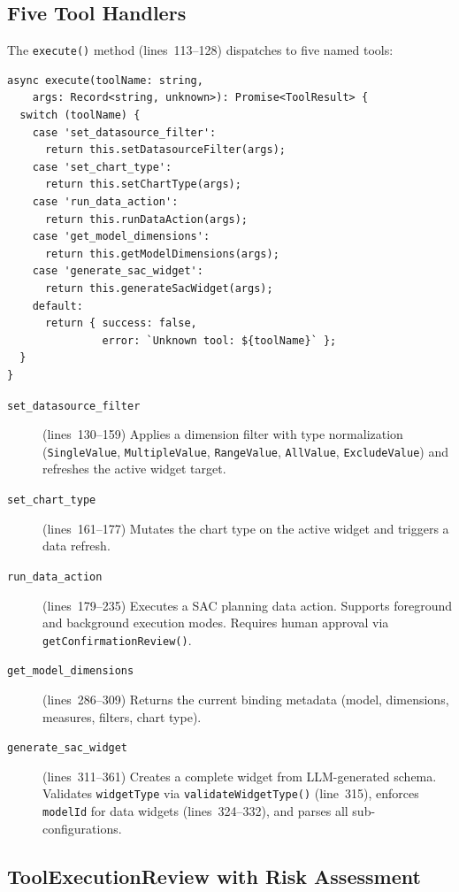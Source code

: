 \documentclass[11pt]{article}
\begin{document}
\subsection{Five Tool Handlers}

The \texttt{execute()} method (lines~113--128) dispatches to five named tools:

\begin{lstlisting}[language={[Sharp]C},caption={Tool dispatch switch (sac-tool-dispatch.service.ts:113--128)}]
async execute(toolName: string,
    args: Record<string, unknown>): Promise<ToolResult> {
  switch (toolName) {
    case 'set_datasource_filter':
      return this.setDatasourceFilter(args);
    case 'set_chart_type':
      return this.setChartType(args);
    case 'run_data_action':
      return this.runDataAction(args);
    case 'get_model_dimensions':
      return this.getModelDimensions(args);
    case 'generate_sac_widget':
      return this.generateSacWidget(args);
    default:
      return { success: false,
               error: `Unknown tool: ${toolName}` };
  }
}
\end{lstlisting}

\begin{description}
  \item[\texttt{set\_datasource\_filter}] (lines~130--159) Applies a dimension
    filter with type normalization (\texttt{SingleValue}, \texttt{MultipleValue},
    \texttt{RangeValue}, \texttt{AllValue}, \texttt{ExcludeValue}) and refreshes
    the active widget target.
  \item[\texttt{set\_chart\_type}] (lines~161--177) Mutates the chart type on
    the active widget and triggers a data refresh.
  \item[\texttt{run\_data\_action}] (lines~179--235) Executes a SAC planning
    data action. Supports foreground and background execution modes. Requires
    human approval via \texttt{getConfirmationReview()}.
  \item[\texttt{get\_model\_dimensions}] (lines~286--309) Returns the current
    binding metadata (model, dimensions, measures, filters, chart type).
  \item[\texttt{generate\_sac\_widget}] (lines~311--361) Creates a complete
    widget from LLM-generated schema. Validates \texttt{widgetType} via
    \texttt{validateWidgetType()} (line~315), enforces \texttt{modelId} for
    data widgets (lines~324--332), and parses all sub-configurations.
\end{description}

\subsection{ToolExecutionReview with Risk Assessment}
\end{document}
